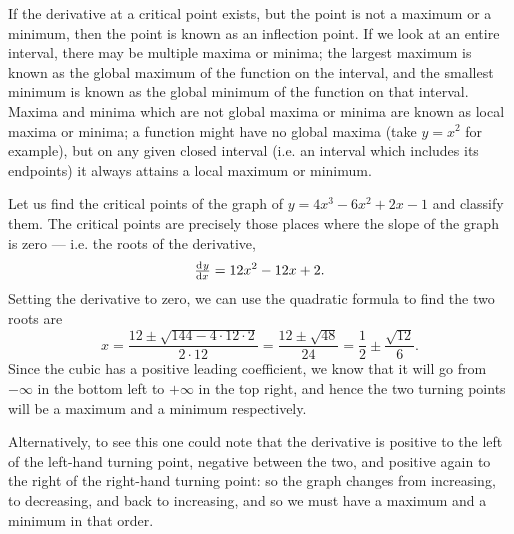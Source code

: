 If the derivative at a critical point exists, but the point is not a maximum or a minimum, then the point is known
as an inflection point. If we look at an entire interval, there may be multiple maxima or minima; the largest maximum
is known as the global maximum of the function on the interval, and the smallest minimum is known as the global minimum
of the function on that interval. Maxima and minima which are not global maxima or minima are known as local maxima
or minima; a function might have no global maxima (take $ y = x^2 $ for example), but on any given closed interval (i.e.
an interval which includes its endpoints) it always attains a local maximum or minimum.

\begin{ex}
  Let us find the critical points of the graph of $ y = 4x^3 - 6x^2 + 2x - 1 $ and classify them. The critical points
  are precisely those places where the slope of the graph is zero --- i.e. the roots of the derivative,
  \begin{displaymath}
    \od{y}{x} = 12x^2 - 12x + 2.
  \end{displaymath}
  Setting the derivative to zero, we can use the quadratic formula to find the two roots are
  \begin{displaymath}
    x = \frac{12 \pm \sqrt{144 - 4 \cdot 12 \cdot 2}}{2 \cdot 12} = \frac{12 \pm \sqrt{48}}{24} = \frac{1}{2} \pm \frac{\sqrt{12}}{6}.
  \end{displaymath}
  Since the cubic has a positive leading coefficient, we know that it will go from $ -\infty $ in the bottom left to $ +\infty $ in the top right,
  and hence the two turning points will be a maximum and a minimum respectively.

  Alternatively, to see this one could note that the derivative is positive to the left of the left-hand turning point, negative between the two,
  and positive again to the right of the right-hand turning point: so the graph changes from increasing, to decreasing, and back to increasing,
  and so we must have a maximum and a minimum in that order.
\end{ex}

